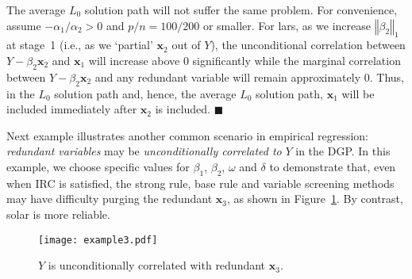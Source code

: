 \documentclass[12pt]{article}
\begin{document}
The average $L_0$ solution path will not suffer the same problem. For convenience, assume $-\alpha_1 / \alpha_2 > 0$ and $p/n = 100/200$ or smaller. For lars, as we increase $\left\Vert \beta_2 \right\Vert_1$ at stage~1 (i.e., as we `partial' $\mathbf{x}_2$ out of $Y$), the unconditional correlation between $Y - \beta_2 \mathbf{x}_2$ and $\mathbf{x}_1$ will increase above $0$ significantly while the marginal correlation between $Y - \beta_2 \mathbf{x}_2$ and any redundant variable will remain approximately $0$. Thus, in the $L_0$ solution path and, hence, the average $L_0$ solution path, $\mathbf{x}_1$ will be included immediately after $\mathbf{x}_2$ is included. $\blacksquare$

\smallskip
Next example illustrates another common scenario in empirical regression: \emph{redundant variables} may be \emph{unconditionally correlated to} $Y$ in the DGP. In this example, we choose specific values for $\beta_1$, $\beta_2$, $\omega$ and $\delta$ to demonstrate that, even when IRC is satisfied, the strong rule, base rule and variable screening methods may have difficulty purging the redundant $\mathbf{x}_3$, as shown in Figure~\ref{fig:cond_example}. By contrast, solar is more reliable.

\begin{figure}[h]
    \centering
    \texttt{[image: example3.pdf]}
    \caption{$Y$ is unconditionally correlated with redundant $\mathbf{x}_3$.}
    \label{fig:cond_example}
  \end{figure}
\end{document}
